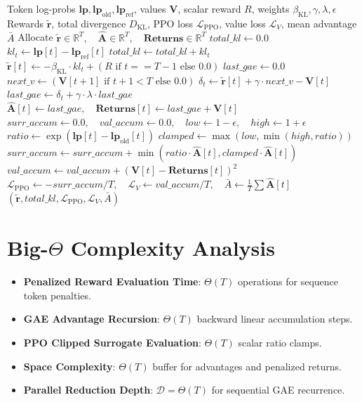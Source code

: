 \documentclass[11pt,a4paper]{article}
\theoremstyle{definition}
\begin{document}
\begin{algorithm}[H]
\caption{RLHF PPO Step Evaluation and GAE Advantage Computation}
\begin{algorithmic}[1]
\Require Token log-probs $\mathbf{lp}, \mathbf{lp}_{\text{old}}, \mathbf{lp}_{\text{ref}}$, values $\mathbf{V}$, scalar reward $R$, weights $\beta_{\text{KL}}, \gamma, \lambda, \epsilon$
\Ensure Rewards $\tilde{\mathbf{r}}$, total divergence $D_{\text{KL}}$, PPO loss $\mathcal{L}_{\text{PPO}}$, value loss $\mathcal{L}_V$, mean advantage $\bar{A}$
\State Allocate $\tilde{\mathbf{r}} \in \mathbb{R}^T, \quad \hat{\mathbf{A}} \in \mathbb{R}^T, \quad \mathbf{Returns} \in \mathbb{R}^T$
\State $total\_kl \gets 0.0$
    \State $kl_t \gets \mathbf{lp}[t] - \mathbf{lp}_{\text{ref}}[t]$
    \State $total\_kl \gets total\_kl + kl_t$
    \State $\tilde{\mathbf{r}}[t] \gets -\beta_{\text{KL}} \cdot kl_t + (R \text{ if } t == T-1 \text{ else } 0.0)$
\EndFor
\State $last\_gae \gets 0.0$
    \State $next\_v \gets (\mathbf{V}[t+1] \text{ if } t+1 < T \text{ else } 0.0)$
    \State $\delta_t \gets \tilde{\mathbf{r}}[t] + \gamma \cdot next\_v - \mathbf{V}[t]$
    \State $last\_gae \gets \delta_t + \gamma \cdot \lambda \cdot last\_gae$
    \State $\hat{\mathbf{A}}[t] \gets last\_gae, \quad \mathbf{Returns}[t] \gets last\_gae + \mathbf{V}[t]$
\EndFor
\State $surr\_accum \gets 0.0, \quad val\_accum \gets 0.0, \quad low \gets 1 - \epsilon, \quad high \gets 1 + \epsilon$
    \State $ratio \gets \exp(\mathbf{lp}[t] - \mathbf{lp}_{\text{old}}[t])$
    \State $clamped \gets \max(low, \min(high, ratio))$
    \State $surr\_accum \gets surr\_accum + \min(ratio \cdot \hat{\mathbf{A}}[t], clamped \cdot \hat{\mathbf{A}}[t])$
    \State $val\_accum \gets val\_accum + (\mathbf{V}[t] - \mathbf{Returns}[t])^2$
\EndFor
\State $\mathcal{L}_{\text{PPO}} \gets - surr\_accum / T, \quad \mathcal{L}_V \gets val\_accum / T, \quad \bar{A} \gets \frac{1}{T}\sum \hat{\mathbf{A}}[t]$
\State \Return $(\tilde{\mathbf{r}}, total\_kl, \mathcal{L}_{\text{PPO}}, \mathcal{L}_V, \bar{A})$
\end{algorithmic}
\end{algorithm}

\section{Big-$\Theta$ Complexity Analysis}

\begin{itemize}
    \item \textbf{Penalized Reward Evaluation Time}: $\Theta(T)$ operations for sequence token penalties.
    \item \textbf{GAE Advantage Recursion}: $\Theta(T)$ backward linear accumulation steps.
    \item \textbf{PPO Clipped Surrogate Evaluation}: $\Theta(T)$ scalar ratio clamps.
    \item \textbf{Space Complexity}: $\Theta(T)$ buffer for advantages and penalized returns.
    \item \textbf{Parallel Reduction Depth}: $\mathcal{D} = \Theta(T)$ for sequential GAE recurrence.
\end{itemize}
\end{document}
